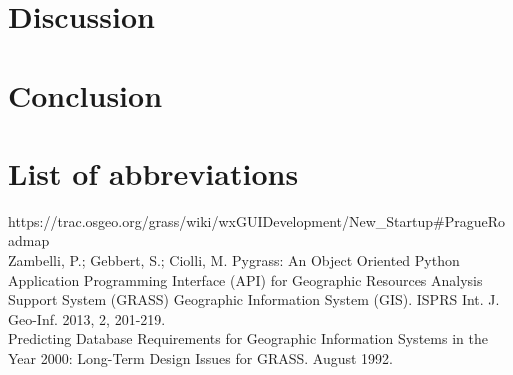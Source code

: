 \documentclass[a4paper,10pt,twoside]{article}
\begin{document}
\section*{Discussion}
\noindent
\large

\newpage
\vspace*{-1cm}
\section*{Conclusion}
\noindent
\large

\newpage
\vspace*{-1cm}
\section*{List of abbreviations}
\noindent
\large


\newpage
\vspace*{-6ex}
\renewcommand{\refname}{Bibliography} 
	
	

\noindent
\large

https://trac.osgeo.org/grass/wiki/wxGUIDevelopment/New\_Startup\#PragueRoadmap \\

Zambelli, P.; Gebbert, S.; Ciolli, M. Pygrass: An Object Oriented Python Application Programming Interface (API) for Geographic Resources Analysis Support System (GRASS) Geographic Information System (GIS). ISPRS Int. J. Geo-Inf. 2013, 2, 201-219. \\

Predicting Database Requirements for Geographic Information Systems in the Year 2000: Long-Term Design Issues for GRASS. August 1992.\\
\end{document}
